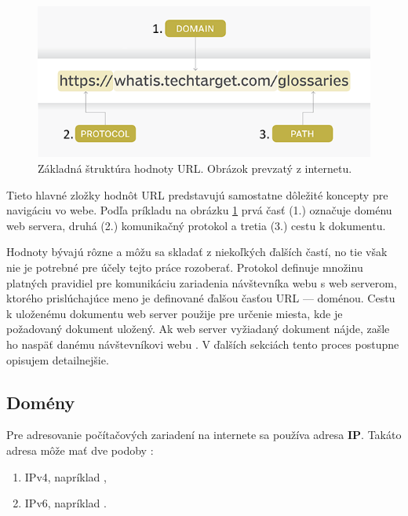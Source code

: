 \begin{figure}[htb]
\begin{center}
 \includegraphics[scale=0.52]{obrazky-figures/the-anatomy-of-a-url.png}
 \caption{Základná štruktúra hodnoty URL. Obrázok prevzatý z internetu.}
 \label{img:urlstructure}
\end{center}
\end{figure}

Tieto hlavné zložky hodnôt URL predstavujú samostatne dôležité koncepty pre navigáciu vo webe.
Podľa príkladu na obrázku \ref{img:urlstructure} prvá časť (1.) označuje doménu web servera, druhá (2.) komunikačný protokol a tretia (3.) cestu k dokumentu. 

\pagebreak

Hodnoty bývajú rôzne a môžu sa skladať z niekoľkých ďalších častí, no tie však nie je potrebné pre účely tejto práce rozoberať.
Protokol definuje množinu platných pravidiel pre komunikáciu zariadenia návštevníka webu s web 
serverom, ktorého prislúchajúce meno je definované ďalšou časťou URL --- doménou. 
Cestu k uloženému dokumentu web server použije pre určenie miesta, kde je požadovaný dokument uložený. 
Ak web server vyžiadaný dokument nájde, zašle ho naspäť danému návštevníkovi webu \cite{mdn-docs-url, wiki-web}.
V ďalších sekciách tento proces postupne opisujem detailnejšie.


\subsection{Domény}
\label{domeny}

Pre adresovanie počítačových zariadení na internete sa používa adresa \textbf{IP}.
Takáto adresa môže mať dve podoby \cite{mdn-docs-domain}:
\begin{enumerate}
    \item IPv4, napríklad ,
    \item IPv6, napríklad .
\end{enumerate}


